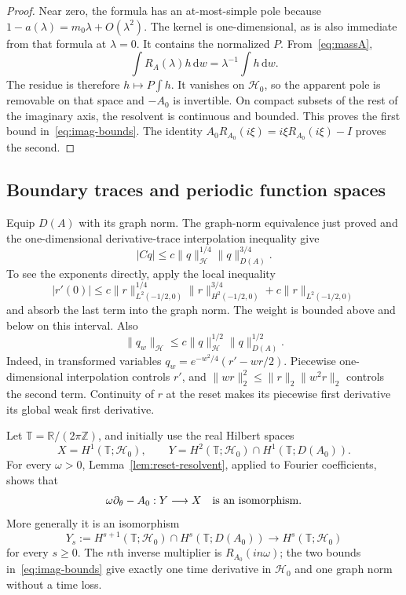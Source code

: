 \documentclass[11pt,a4paper]{article}
\numberwithin{equation}{section}
\theoremstyle{remark}\newtheorem{remark}[theorem]{Remark}
\newcommand{\R}{\mathbb R}\newcommand{\C}{\mathbb C}\newcommand{\T}{\mathbb T}
\newcommand{\HH}{\mathcal H}\newcommand{\DD}{\mathcal D}
\newcommand{\dd}{\,\mathrm d}
\begin{document}
\begin{proof}
Near zero, the formula has an at-most-simple pole because $1-a(\lambda)=m_0\lambda+O(\lambda^2)$. The kernel is one-dimensional, as is also immediate from that formula at $\lambda=0$. It contains the normalized $P$. From~\eqref{eq:massA},
\[
 \int R_A(\lambda)h\dd w=\lambda^{-1}\int h\dd w.
\]
The residue is therefore $h\mapsto P\int h$. It vanishes on $\HH_0$, so the apparent pole is removable on that space and $-A_0$ is invertible. On compact subsets of the rest of the imaginary axis, the resolvent is continuous and bounded. This proves the first bound in~\eqref{eq:imag-bounds}. The identity $A_0R_{A_0}(i\xi)=i\xi R_{A_0}(i\xi)-I$ proves the second.
\end{proof}

\subsection{Boundary traces and periodic function spaces}
Equip $D(A)$ with its graph norm. The graph-norm equivalence just proved and the one-dimensional derivative-trace interpolation inequality give
\begin{equation}\label{eq:trace-interpolation}
 |Cq|\leq c\|q\|_\HH^{1/4}\|q\|_{D(A)}^{3/4}.
\end{equation}
To see the exponents directly, apply the local inequality
\[
 |r'(0)|\leq c\|r\|_{L^2(-1/2,0)}^{1/4}
                  \|r\|_{H^2(-1/2,0)}^{3/4}
             +c\|r\|_{L^2(-1/2,0)}
\]
and absorb the last term into the graph norm. The weight is bounded above and below on this interval. Also
\begin{equation}\label{eq:derivative-interpolation}
 \|q_w\|_\HH\leq
 c\|q\|_\HH^{1/2}\|q\|_{D(A)}^{1/2}.
\end{equation}
Indeed, in transformed variables $q_w=e^{-w^2/4}(r'-wr/2)$. Piecewise one-dimensional interpolation controls $r'$, and
$\|wr\|_2^2\leq\|r\|_2\|w^2r\|_2$ controls the second term. Continuity of $r$ at the reset makes its piecewise first derivative its global weak first derivative.

Let $\T=\R/(2\pi\mathbb Z)$, and initially use the real Hilbert spaces
\begin{equation}\label{eq:XY}
 X=H^1(\T;\HH_0),\qquad
 Y=H^2(\T;\HH_0)\cap H^1(\T;D(A_0)).
\end{equation}
For every $\omega>0$, Lemma~\ref{lem:reset-resolvent}, applied to Fourier coefficients, shows that
\begin{equation}\label{eq:periodiciso}
 \omega\partial_\theta-A_0:Y\longrightarrow X
 \quad\hbox{is an isomorphism}.
\end{equation}
More generally it is an isomorphism
\[
 Y_s:=H^{s+1}(\T;\HH_0)\cap H^s(\T;D(A_0))
 \longrightarrow H^s(\T;\HH_0)
\]
for every $s\geq0$. The $n$th inverse multiplier is $R_{A_0}(in\omega)$; the two bounds in~\eqref{eq:imag-bounds} give exactly one time derivative in $\HH_0$ and one graph norm without a time loss.
\end{document}
